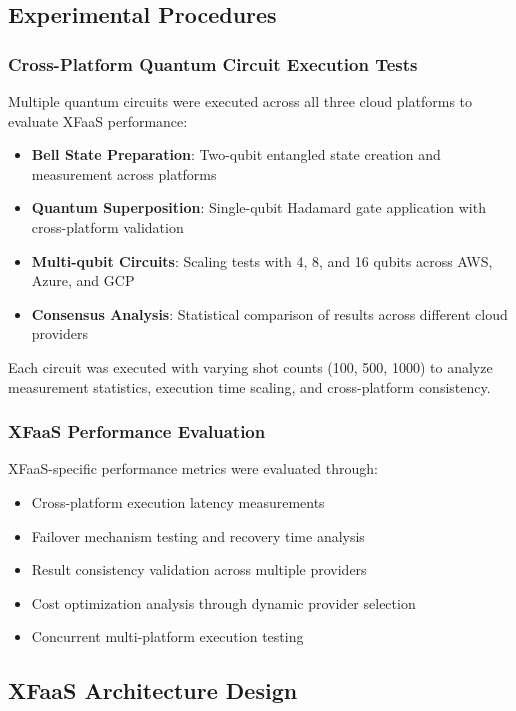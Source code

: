 \documentclass[onecolumn]{IEEEtran}
\begin{document}
\subsection{Experimental Procedures}

\subsubsection{Cross-Platform Quantum Circuit Execution Tests}

Multiple quantum circuits were executed across all three cloud platforms to evaluate XFaaS performance:

\begin{itemize}
    \item \textbf{Bell State Preparation}: Two-qubit entangled state creation and measurement across platforms
    \item \textbf{Quantum Superposition}: Single-qubit Hadamard gate application with cross-platform validation
    \item \textbf{Multi-qubit Circuits}: Scaling tests with 4, 8, and 16 qubits across AWS, Azure, and GCP
    \item \textbf{Consensus Analysis}: Statistical comparison of results across different cloud providers
\end{itemize}

Each circuit was executed with varying shot counts (100, 500, 1000) to analyze measurement statistics, execution time scaling, and cross-platform consistency.

\subsubsection{XFaaS Performance Evaluation}

XFaaS-specific performance metrics were evaluated through:
\begin{itemize}
    \item Cross-platform execution latency measurements
    \item Failover mechanism testing and recovery time analysis
    \item Result consistency validation across multiple providers
    \item Cost optimization analysis through dynamic provider selection
    \item Concurrent multi-platform execution testing
\end{itemize}

\subsection{XFaaS Architecture Design}
\end{document}
